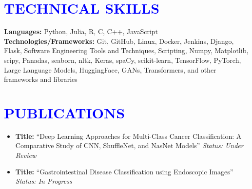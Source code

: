 \documentclass[letterpaper,11pt]{article}
\begin{document}
	\section{\textcolor{blue}{TECHNICAL SKILLS}}
	\begin{itemize}[leftmargin=0.15in, label={}]
		\small{\item{
				
				\textbf{\normalsize{Languages:}}{ \normalsize{Python, Julia, R, C, C++, JavaScript}} \\
				\textbf{\normalsize{Technologies/Frameworks:}}{\normalsize{ Git, GitHub, Linux, Docker, Jenkins, Django, Flask, Software Engineering Tools and Techniques, Scripting, Numpy, Matplotlib, scipy, Panadas, seaborn, nltk, Keras, spaCy, scikit-learn, TensorFlow, PyTorch, Large Language Models, HuggingFace, GANs, Transformers, and other frameworks and libraries}} \\
		}}
	\end{itemize}
	\vspace{-5pt}
	

\section*{\textcolor{blue}{PUBLICATIONS}}

\begin{itemize}
	\item \textbf{Title:} ``Deep Learning Approaches for Multi-Class Cancer Classification:
	A Comparative Study of CNN, ShuffleNet, and NasNet Models'' \hfill \textit{Status: Under Review} \\ 
	\item \textbf{Title:} ``Gastrointestinal Disease Classification using Endoscopic Images'' \hfill \textit{Status: In Progress} \\ 
\end{itemize}


	
\end{document}
